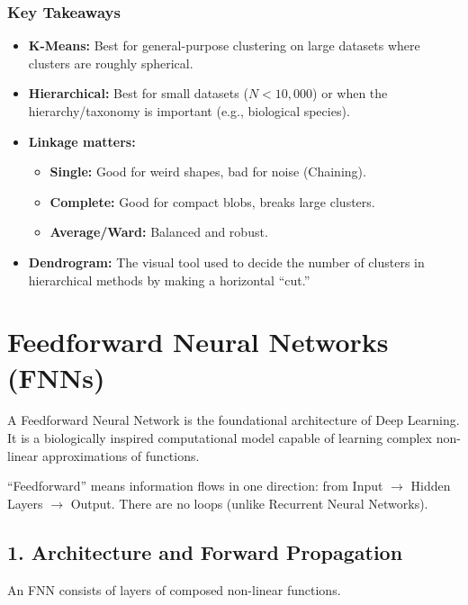 \documentclass[
  italian,
  11pt,
]{article}
\begin{document}
\subsubsection{Key Takeaways}\label{key-takeaways-21}

\begin{itemize}
\item
  \textbf{K-Means:} Best for general-purpose clustering on large
  datasets where clusters are roughly spherical.
\item
  \textbf{Hierarchical:} Best for small datasets (\(N < 10,000\)) or
  when the hierarchy/taxonomy is important (e.g., biological species).
\item
  \textbf{Linkage matters:}

  \begin{itemize}
  \item
    \textbf{Single:} Good for weird shapes, bad for noise (Chaining).
  \item
    \textbf{Complete:} Good for compact blobs, breaks large clusters.
  \item
    \textbf{Average/Ward:} Balanced and robust.
  \end{itemize}
\item
  \textbf{Dendrogram:} The visual tool used to decide the number of
  clusters in hierarchical methods by making a horizontal ``cut.''

  \newpage
\end{itemize}

\section{Feedforward Neural Networks
(FNNs)}\label{feedforward-neural-networks-fnns}

A Feedforward Neural Network is the foundational architecture of Deep
Learning. It is a biologically inspired computational model capable of
learning complex non-linear approximations of functions.

``Feedforward'' means information flows in one direction: from Input
\(\to\) Hidden Layers \(\to\) Output. There are no loops (unlike
Recurrent Neural Networks).

\subsection{1. Architecture and Forward
Propagation}\label{architecture-and-forward-propagation}

An FNN consists of layers of composed non-linear functions.
\end{document}
